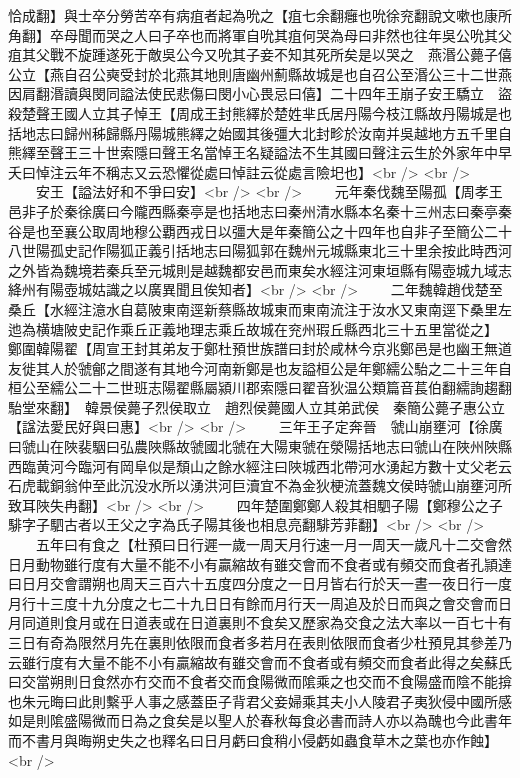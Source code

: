 恰成翻】與士卒分勞苦卒有病疽者起為吮之【疽七余翻癰也吮徐兖翻說文嗽也康所角翻】卒母聞而哭之人曰子卒也而將軍自吮其疽何哭為母曰非然也往年吳公吮其父疽其父戰不旋踵遂死于敵吳公今又吮其子妾不知其死所矣是以哭之　燕湣公薨子僖公立【燕自召公奭受封於北燕其地則唐幽州薊縣故城是也自召公至湣公三十二世燕因肩翻湣讀與閔同謚法使民悲傷曰閔小心畏忌曰僖】二十四年王崩子安王驕立　盜殺楚聲王國人立其子悼王【周成王封熊繹於楚姓芈氏居丹陽今枝江縣故丹陽城是也括地志曰歸州秭歸縣丹陽城熊繹之始國其後彊大北封畛於汝南并吳越地方五千里自熊繹至聲王三十世索隱曰聲王名當悼王名疑謚法不生其國曰聲注云生於外家年中早夭曰悼注云年不稱志又云恐懼從處曰悼註云從處言險圯也】<br />
<br />
　　安王【謚法好和不爭曰安】<br />
<br />
　　元年秦伐魏至陽孤【周孝王邑非子於秦徐廣曰今隴西縣秦亭是也括地志曰秦州清水縣本名秦十三州志曰秦亭秦谷是也至襄公取周地穆公覇西戎日以彊大是年秦簡公之十四年也自非子至簡公二十八世陽孤史記作陽狐正義引括地志曰陽狐郭在魏州元城縣東北三十里余按此時西河之外皆為魏境若秦兵至元城則是越魏都安邑而東矣水經注河東垣縣有陽壺城九域志絳州有陽壺城姑識之以廣異聞且俟知者】<br />
<br />
　　二年魏韓趙伐楚至桑丘【水經注澺水自葛陂東南逕新蔡縣故城東而東南流注于汝水又東南逕下桑里左迆為横塘陂史記作乘丘正義地理志乘丘故城在兖州瑕丘縣西北三十五里當從之】　鄭圍韓陽翟【周宣王封其弟友于鄭杜預世族譜曰封於咸林今京兆鄭邑是也幽王無道友徙其人於虢鄶之間遂有其地今河南新鄭是也友謚桓公是年鄭繻公駘之二十三年自桓公至繻公二十二世班志陽翟縣屬潁川郡索隱曰翟音狄温公類篇音萇伯翻繻詢趨翻駘堂來翻】　韓景侯薨子烈侯取立　趙烈侯薨國人立其弟武侯　秦簡公薨子惠公立【諡法愛民好與曰惠】<br />
<br />
　　三年王子定奔晉　虢山崩壅河【徐廣曰虢山在陜裴駰曰弘農陜縣故虢國北虢在大陽東虢在滎陽括地志曰虢山在陜州陜縣西臨黄河今臨河有岡阜似是頹山之餘水經注曰陜城西北帶河水湧起方數十丈父老云石虎載銅翁仲至此沉没水所以湧洪河巨瀆宜不為金狄梗流蓋魏文侯時虢山崩壅河所致耳陜失冉翻】<br />
<br />
　　四年楚圍鄭鄭人殺其相駟子陽【鄭穆公之子騑字子駟古者以王父之字為氏子陽其後也相息亮翻騑芳菲翻】<br />
<br />
　　五年曰有食之【杜預曰日行遲一歲一周天月行速一月一周天一歲凡十二交會然日月動物雖行度有大量不能不小有贏縮故有雖交會而不食者或有頻交而食者孔頴達曰日月交會謂朔也周天三百六十五度四分度之一日月皆右行於天一晝一夜日行一度月行十三度十九分度之七二十九日日有餘而月行天一周追及於日而與之會交會而日月同道則食月或在日道表或在日道裏則不食矣又歷家為交食之法大率以一百七十有三日有奇為限然月先在裏則依限而食者多若月在表則依限而食者少杜預見其參差乃云雖行度有大量不能不小有贏縮故有雖交會而不食者或有頻交而食者此得之矣蘇氏曰交當朔則日食然亦冇交而不食者交而食陽微而隂乘之也交而不食陽盛而陰不能揜也朱元晦曰此則繫乎人事之感蓋臣子背君父妾婦乘其夫小人陵君子夷狄侵中國所感如是則隂盛陽微而日為之食矣是以聖人於春秋每食必書而詩人亦以為醜也今此書年而不書月與晦朔史失之也釋名曰日月虧曰食稍小侵虧如蟲食草木之葉也亦作蝕】<br />
